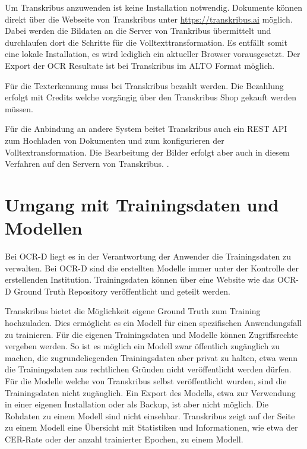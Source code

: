 \documentclass[a4paper,oneside, 12pt]{report}
\begin{document}
Um Transkribus anzuwenden ist keine Installation notwendig. Dokumente können direkt über die Webseite von Transkribus unter \url{https://transkribus.ai} möglich. Dabei werden die Bildaten an die Server von Trankribus übermittelt und durchlaufen dort die Schritte für die Volltexttransformation. Es entfällt somit eine lokale Installation, es wird lediglich ein aktueller Browser vorausgesetzt. Der Export der OCR Resultate ist bei Transkribus im ALTO Format möglich. \cite{transkribus}

Für die Texterkennung muss bei Transkribus bezahlt werden. Die Bezahlung erfolgt mit Credits welche vorgängig über den Transkribus Shop gekauft werden müssen. \cite{transkribuspricing}

Für die Anbindung an andere System beitet Transkribus auch ein REST API zum Hochladen von Dokumenten und zum konfigurieren der Volltextransformation. Die Bearbeitung der Bilder erfolgt aber auch in diesem Verfahren auf den Servern von Transkribus. \cite{transkribusapi}. 

\section{Umgang mit Trainingsdaten und Modellen}
Bei OCR-D liegt es in der Verantwortung der Anwender die Trainingsdaten zu verwalten. Bei OCR-D sind die erstellten Modelle immer unter der Kontrolle der erstellenden Institution. Trainingsdaten können über eine Website wie das OCR-D Ground Truth Repository veröffentlicht und geteilt werden. \cite{ocrdgtrepo}

Transkribus bietet die Möglichkeit eigene Ground Truth zum Training hochzuladen. Dies ermöglicht es ein Modell für einen spezifischen Anwendungsfall zu trainieren. Für die eigenen Trainingsdaten und Modelle können Zugriffsrechte vergeben werden. So ist es möglich ein Modell zwar öffentlich zugänglich zu machen, die zugrundeliegenden Trainingsdaten aber privat zu halten, etwa wenn die Trainingsdaten aus rechtlichen Gründen nicht veröffentlicht werden dürfen. Für die Modelle welche von Transkribus selbst veröffentlicht wurden, sind die Trainingsdaten nicht zugänglich. Ein Export des Modells, etwa zur Verwendung in einer eigenen Installation oder als Backup, ist aber nicht möglich. Die Rohdaten zu einem Modell sind nicht einsehbar. Transkribus zeigt auf der Seite zu einem Modell eine Übersicht mit Statistiken und Informationen, wie etwa der CER-Rate oder der anzahl trainierter Epochen, zu einem Modell. \cite{transkribusmodels}
\end{document}
